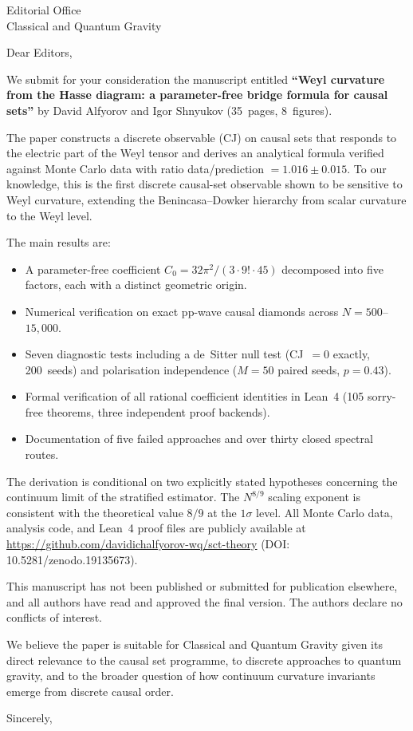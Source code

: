 \documentclass[12pt,a4paper]{letter}
\date{March 31, 2026}
\begin{document}
\begin{letter}{Editorial Office\\Classical and Quantum Gravity}

\opening{Dear Editors,}

We submit for your consideration the manuscript entitled
\textbf{``Weyl curvature from the Hasse diagram: a parameter-free
bridge formula for causal sets''} by David Alfyorov and Igor
Shnyukov (35~pages, 8~figures).

The paper constructs a discrete observable (CJ) on causal sets that
responds to the electric part of the Weyl tensor and derives an
analytical formula verified against Monte Carlo data with ratio
data/prediction $= 1.016 \pm 0.015$.  To our knowledge, this is
the first discrete causal-set observable shown to be sensitive to
Weyl curvature, extending the Benincasa--Dowker hierarchy from
scalar curvature to the Weyl level.

The main results are:
\begin{itemize}
\item A parameter-free coefficient
  $C_0 = 32\pi^2/(3 \cdot 9! \cdot 45)$ decomposed into five
  factors, each with a distinct geometric origin.
\item Numerical verification on exact pp-wave causal diamonds
  across $N = 500$--$15{,}000$.
\item Seven diagnostic tests including a de~Sitter null test
  (CJ~$= 0$ exactly, 200~seeds) and polarisation independence
  ($M = 50$ paired seeds, $p = 0.43$).
\item Formal verification of all rational coefficient identities
  in Lean~4 (105 sorry-free theorems, three independent proof
  backends).
\item Documentation of five failed approaches and over thirty
  closed spectral routes.
\end{itemize}

The derivation is conditional on two explicitly stated hypotheses
concerning the continuum limit of the stratified estimator.  The
$N^{8/9}$ scaling exponent is consistent with the theoretical
value $8/9$ at the $1\sigma$ level.  All Monte Carlo data,
analysis code, and Lean~4 proof files are publicly available at
\url{https://github.com/davidichalfyorov-wq/sct-theory}
(DOI: 10.5281/zenodo.19135673).

This manuscript has not been published or submitted for
publication elsewhere, and all authors have read and approved the
final version.  The authors declare no conflicts of interest.

We believe the paper is suitable for Classical and Quantum Gravity
given its direct relevance to the causal set programme, to
discrete approaches to quantum gravity, and to the broader
question of how continuum curvature invariants emerge from
discrete causal order.

\closing{Sincerely,}

\end{letter}
\end{document}
